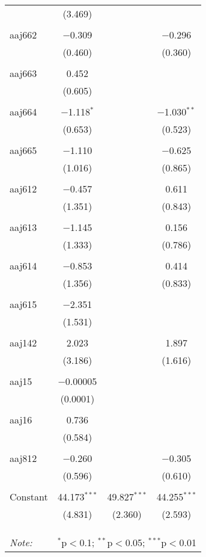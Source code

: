 \begin{table}[!htbp]
\begin{tabular}{@{\extracolsep{5pt}}lccc}
  & (3.469) &  &  \\ 
  & & & \\ 
 aaj662 & $-$0.309 &  & $-$0.296 \\ 
  & (0.460) &  & (0.360) \\ 
  & & & \\ 
 aaj663 & 0.452 &  &  \\ 
  & (0.605) &  &  \\ 
  & & & \\ 
 aaj664 & $-$1.118$^{*}$ &  & $-$1.030$^{**}$ \\ 
  & (0.653) &  & (0.523) \\ 
  & & & \\ 
 aaj665 & $-$1.110 &  & $-$0.625 \\ 
  & (1.016) &  & (0.865) \\ 
  & & & \\ 
 aaj612 & $-$0.457 &  & 0.611 \\ 
  & (1.351) &  & (0.843) \\ 
  & & & \\ 
 aaj613 & $-$1.145 &  & 0.156 \\ 
  & (1.333) &  & (0.786) \\ 
  & & & \\ 
 aaj614 & $-$0.853 &  & 0.414 \\ 
  & (1.356) &  & (0.833) \\ 
  & & & \\ 
 aaj615 & $-$2.351 &  &  \\ 
  & (1.531) &  &  \\ 
  & & & \\ 
 aaj142 & 2.023 &  & 1.897 \\ 
  & (3.186) &  & (1.616) \\ 
  & & & \\ 
 aaj15 & $-$0.00005 &  &  \\ 
  & (0.0001) &  &  \\ 
  & & & \\ 
 aaj16 & 0.736 &  &  \\ 
  & (0.584) &  &  \\ 
  & & & \\ 
 aaj812 & $-$0.260 &  & $-$0.305 \\ 
  & (0.596) &  & (0.610) \\ 
  & & & \\ 
 Constant & 44.173$^{***}$ & 49.827$^{***}$ & 44.255$^{***}$ \\ 
  & (4.831) & (2.360) & (2.593) \\ 
  & & & \\ 
\hline \\[-1.8ex] 
\hline 
\hline \\[-1.8ex] 
\textit{Note:}  & \multicolumn{3}{r}{$^{*}$p$<$0.1; $^{**}$p$<$0.05; $^{***}$p$<$0.01} \\ 
\end{tabular} 
\end{table} 
